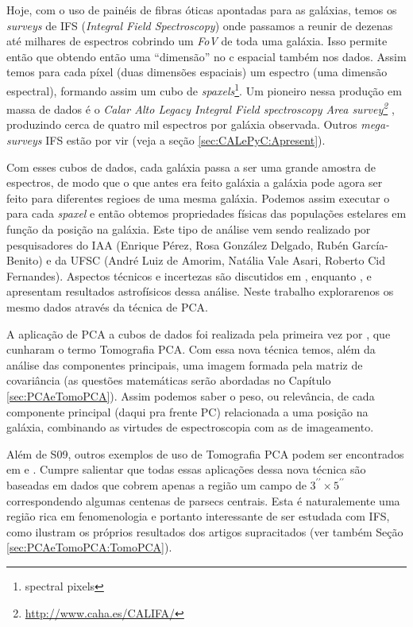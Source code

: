 Hoje, com o uso de painéis de fibras óticas apontadas para as galáxias, temos os {\em surveys} de IFS ({\em Integral
Field Spectroscopy}) onde passamos a reunir de dezenas até milhares de espectros cobrindo um {\em FoV} de toda uma
galáxia. Isso permite então que obtendo então uma ``dimensão'' no c espacial também nos dados. Assim temos para cada
píxel (duas dimensões espaciais) um espectro (uma dimensão espectral), formando assim um cubo de {\em
spaxels}\footnote{spectral pixels}. Um pioneiro nessa produção em massa de dados é o {\em Calar Alto Legacy Integral
Field spectroscopy Area survey\footnote{\url{http://www.caha.es/CALIFA/}}} \citep[CALIFA; ][]{CALIFAPresent2012},
produzindo cerca de quatro mil espectros por galáxia observada. Outros {\em mega-surveys} IFS estão por vir (veja a
seção \ref{sec:CALePyC:Apresent}).

Com esses cubos de dados, cada galáxia passa a ser uma grande amostra de espectros, de modo que o que antes era feito
galáxia a galáxia pode agora ser feito para diferentes regioes de uma mesma galáxia. Podemos assim executar o \starlight
para cada {\em spaxel} e então obtemos propriedades físicas das populações estelares em função da posição na galáxia.
Este tipo de análise vem sendo realizado por pesquisadores do IAA (Enrique Pérez, Rosa González Delgado, Rubén
García-Benito) e da UFSC (André Luiz de Amorim, Natália Vale Asari, Roberto Cid Fernandes). Aspectos técnicos e
incertezas são discutidos em \citep[][CF13 e CF14 daqui pra frente]{CidFernandes2013, CidFernandes2014}, enquanto
\citep{Perez2013}, e \citep{GonzalezDelgado2013} apresentam resultados astrofísicos dessa análise. Neste trabalho
explorarenos os mesmo dados através da técnica de PCA.

A aplicação de PCA a cubos de dados foi realizada pela primeira vez por \citet[][S09 daqui pra frente]{Steiner2009},
que cunharam o termo Tomografia PCA. Com essa nova técnica temos, além da análise das componentes principais, uma imagem formada pela matriz
de covariância (as questões matemáticas serão abordadas no Capítulo \ref{sec:PCAeTomoPCA}). Assim podemos saber o peso,
ou relevância, de cada componente principal (daqui pra frente PC) relacionada a uma posição na galáxia, combinando as
virtudes de espectroscopia com as de imageamento.

Além de S09, outros exemplos de uso de Tomografia PCA podem ser encontrados em \citet{Riffel2011} e \citet{Ricci2011}.
Cumpre salientar que todas essas aplicações dessa nova técnica são baseadas em dados que cobrem apenas a região um campo
de \ojo $3^{\prime\prime} \times 5^{\prime\prime}$ correspondendo algumas centenas de parsecs centrais. Esta é
naturalemente uma região rica em fenomenologia e portanto interessante de ser estudada com IFS, como ilustram os
próprios resultados dos artigos supracitados (ver também Seção \ref{sec:PCAeTomoPCA:TomoPCA}).


